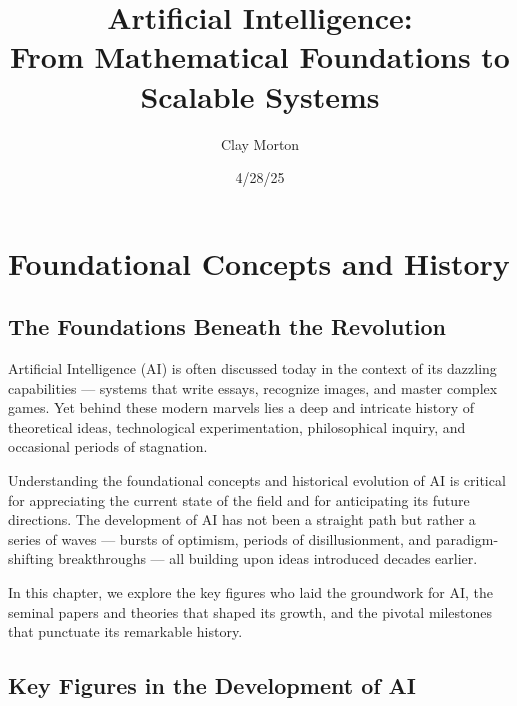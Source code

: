 \documentclass[openany]{book}
\title{Artificial Intelligence: \\ From Mathematical Foundations to Scalable Systems}
\author{Clay Morton}
\date{4/28/25}
\begin{document}
\maketitle

\begingroup
\let\cleardoublepage\relax
\tableofcontents
\endgroup

\chapter{Foundational Concepts and History}

\section{The Foundations Beneath the Revolution}

Artificial Intelligence (AI) is often discussed today in the context of its 
dazzling capabilities — systems that write essays, recognize images, and master 
complex games. Yet behind these modern marvels lies a deep and intricate history 
of theoretical ideas, technological experimentation, philosophical inquiry, and 
occasional periods of stagnation.

Understanding the foundational concepts and historical evolution of AI is 
critical for appreciating the current state of the field and for anticipating 
its future directions. The development of AI has not been a straight path but 
rather a series of waves — bursts of optimism, periods of disillusionment, and 
paradigm-shifting breakthroughs — all building upon ideas introduced decades 
earlier.

In this chapter, we explore the key figures who laid the groundwork for AI, the
seminal papers and theories that shaped its growth, and the pivotal milestones 
that punctuate its remarkable history.

\section{Key Figures in the Development of AI}
\end{document}
